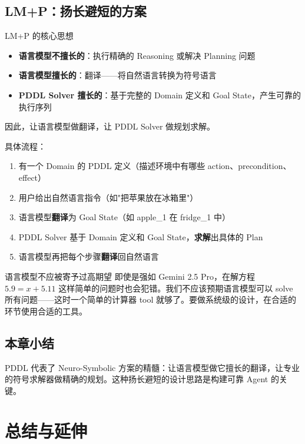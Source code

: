 \documentclass[a4paper]{article}
\begin{document}
\subsection{LM+P：扬长避短的方案}

\begin{importantbox}{LM+P 的核心思想}
\begin{itemize}
    \item \textbf{语言模型不擅长的}：执行精确的 Reasoning 或解决 Planning 问题
    \item \textbf{语言模型擅长的}：翻译——将自然语言转换为符号语言
    \item \textbf{PDDL Solver 擅长的}：基于完整的 Domain 定义和 Goal State，产生可靠的执行序列
\end{itemize}
因此，让语言模型做翻译，让 PDDL Solver 做规划求解。
\end{importantbox}

具体流程：
\begin{enumerate}
    \item 有一个 Domain 的 PDDL 定义（描述环境中有哪些 action、precondition、effect）
    \item 用户给出自然语言指令（如"把苹果放在冰箱里"）
    \item 语言模型\textbf{翻译}为 Goal State（如 apple\_1 在 fridge\_1 中）
    \item PDDL Solver 基于 Domain 定义和 Goal State，\textbf{求解}出具体的 Plan
    \item 语言模型再把每个步骤\textbf{翻译}回自然语言
\end{enumerate}

\begin{warningbox}{语言模型不应被寄予过高期望}
即使是强如 Gemini 2.5 Pro，在解方程 $5.9 = x + 5.11$ 这样简单的问题时也会犯错。我们不应该预期语言模型可以 solve 所有问题——这时一个简单的计算器 tool 就够了。要做系统级的设计，在合适的环节使用合适的工具。
\end{warningbox}

\subsection{本章小结}

PDDL 代表了 Neuro-Symbolic 方案的精髓：让语言模型做它擅长的翻译，让专业的符号求解器做精确的规划。这种扬长避短的设计思路是构建可靠 Agent 的关键。


\section{总结与延伸}
\end{document}
